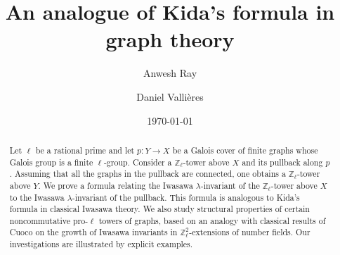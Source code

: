 \documentclass[11pt]{amsart}
\numberwithin{equation}{section}
\theoremstyle{remark}
\newcommand{\Z}{\mathbb{Z}}
\newcommand{\DV}[1]{\textcolor{blue}{#1}}
\begin{document}
\title[An analogue of Kida's formula in graph theory]{An analogue of Kida's formula in graph theory}


\author[A.~Ray]{Anwesh Ray}
\address[Ray]{Chennai Mathematical Institute, H1, SIPCOT IT Park, Kelambakkam, Siruseri, Tamil Nadu 603103, India}

\author[D.~Valli\`{e}res]{Daniel Valli\`{e}res}
\address{Daniel Valli\`{e}res\newline Mathematics and Statistics Department, California State University, Chico, CA 95929, USA}


\begin{abstract}
Let $\ell$ be a rational prime and let $p:Y\rightarrow X$ be a Galois cover of finite graphs whose Galois group is a finite $\ell$-group. Consider a $\mathbb{Z}_{\ell}$-tower above $X$ and its pullback along $p$. Assuming that all the graphs in the pullback are connected, one obtains a $\mathbb{Z}_{\ell}$-tower above $Y$. %
We prove a formula relating the Iwasawa $\lambda$-invariant of the $\mathbb{Z}_{\ell}$-tower above $X$ to the Iwasawa $\lambda$-invariant of the pullback.  This formula is analogous to Kida's formula in classical Iwasawa theory. We also study structural properties of certain noncommutative pro-$\ell$ towers of graphs, based on an analogy with classical results of Cuoco on the growth of Iwasawa invariants in $\Z_\ell^2$-extensions of number fields. Our investigations are illustrated by explicit examples. %
\end{abstract}

\date{\today} 

\maketitle
\tableofcontents 
 
\end{document}
